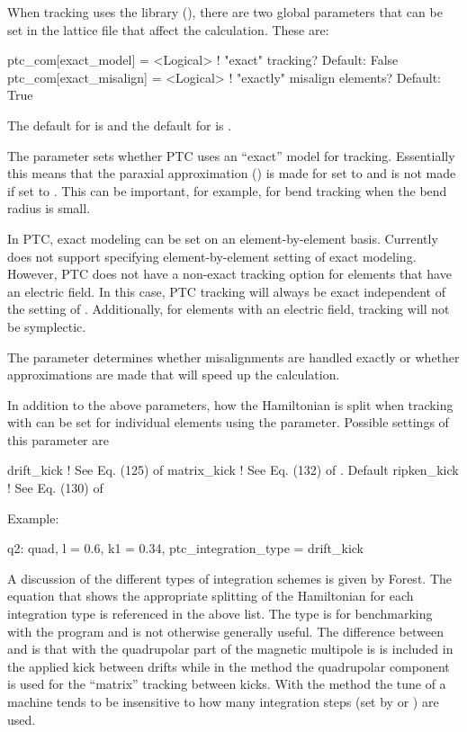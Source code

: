 When tracking uses the  library (), there are two global parameters that
can be set in the lattice file that affect the calculation. These are:
\begin{example}
  ptc_com[exact_model]    = <Logical>  ! "exact" tracking? Default: False
  ptc_com[exact_misalign] = <Logical>  ! "exactly" misalign elements? Default: True
\end{example}
The default for  is  and the default for
 is . 

The  parameter sets whether PTC uses an ``exact'' model for
tracking. Essentially this means that the paraxial approximation () is made
for  set to  and is not made if set to . This can be
important, for example, for bend tracking when the bend radius is small.

In PTC, exact modeling can be set on an element-by-element basis. Currently \bmad does not support
specifying element-by-element setting of exact modeling. However, PTC does not have a non-exact
tracking option for elements that have an electric field. In this case, PTC tracking will always be
exact independent of the setting of .  Additionally, for elements with an
electric field, tracking will not be symplectic.

The  parameter determines whether misalignments are handled exactly or
whether approximations are made that will speed up the calculation.

In addition to the above parameters, how the Hamiltonian is split when tracking with  can be
set for individual elements using the  parameter. Possible settings of this
parameter are
\begin{example}
  drift_kick    ! See Eq. (125) of \cite{b:geo.int}
  matrix_kick   ! See Eq. (132) of \cite{b:geo.int}. Default
  ripken_kick   ! See Eq. (130) of \cite{b:geo.int}
\end{example}
Example:
\begin{example}
  q2: quad, l = 0.6, k1 = 0.34, ptc_integration_type = drift_kick
\end{example}
A discussion of the different types of integration schemes is given by Forest\cite{b:geo.int}. The
equation that shows the appropriate splitting of the Hamiltonian for each integration type is
referenced in the above list. The  type is for benchmarking with the 
program and is not otherwise generally useful. The difference between  and
 is that with  the quadrupolar part of the magnetic multipole is is
included in the applied kick between drifts while in the  method the quadrupolar
component is used for the ``matrix'' tracking between kicks. With the  method the
tune of a machine tends to be insensitive to how many integration steps (set by  or
) are used.

